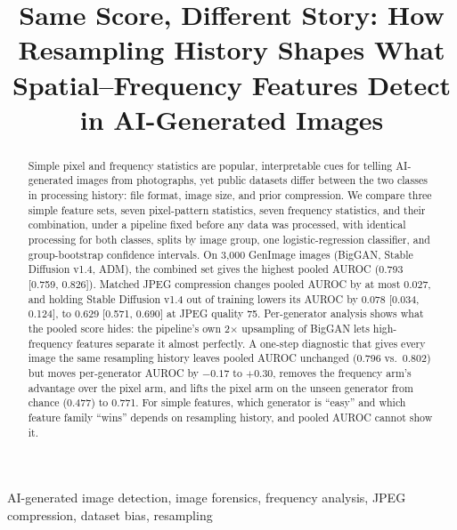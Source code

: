 \documentclass[conference]{IEEEtran}
\begin{document}
\title{Same Score, Different Story: How Resampling History Shapes What Spatial--Frequency Features Detect in AI-Generated Images}

\author{
}

\maketitle

\begin{abstract}
Simple pixel and frequency statistics are popular, interpretable cues for telling AI-generated images from photographs, yet public datasets differ between the two classes in processing history: file format, image size, and prior compression. We compare three simple feature sets, seven pixel-pattern statistics, seven frequency statistics, and their combination, under a pipeline fixed before any data was processed, with identical processing for both classes, splits by image group, one logistic-regression classifier, and group-bootstrap confidence intervals. On 3,000 GenImage images (BigGAN, Stable Diffusion v1.4, ADM), the combined set gives the highest pooled AUROC (0.793 [0.759, 0.826]). Matched JPEG compression changes pooled AUROC by at most 0.027, and holding Stable Diffusion v1.4 out of training lowers its AUROC by 0.078 [0.034, 0.124], to 0.629 [0.571, 0.690] at JPEG quality 75. Per-generator analysis shows what the pooled score hides: the pipeline's own 2$\times$ upsampling of BigGAN lets high-frequency features separate it almost perfectly. A one-step diagnostic that gives every image the same resampling history leaves pooled AUROC unchanged (0.796 vs.\ 0.802) but moves per-generator AUROC by $-0.17$ to $+0.30$, removes the frequency arm's advantage over the pixel arm, and lifts the pixel arm on the unseen generator from chance (0.477) to 0.771. For simple features, which generator is ``easy'' and which feature family ``wins'' depends on resampling history, and pooled AUROC cannot show it.
\end{abstract}

\begin{IEEEkeywords}
AI-generated image detection, image forensics, frequency analysis, JPEG compression, dataset bias, resampling
\end{IEEEkeywords}
\end{document}
